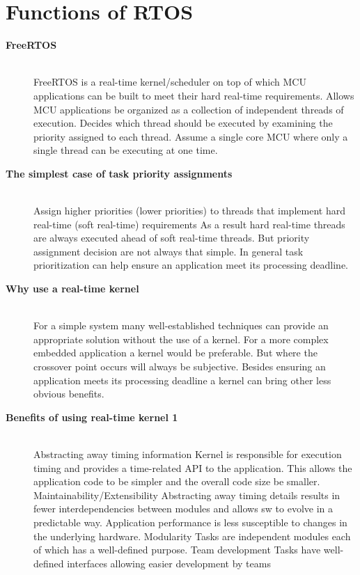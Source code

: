 \section{Functions of RTOS}
\begin{description}


\item[{\rot\bf FreeRTOS}]~\\[-3ex]
\bi
\ite FreeRTOS is a real-time kernel/scheduler on top of which MCU applications can be built to meet their hard real-time requirements.
\bi
\ite Allows MCU applications be organized as a collection of independent threads of execution.
\ite Decides which thread should be executed by examining the priority assigned to each thread.
\bi
\ite Assume a single core MCU where only a single thread can be executing at one time.
\ei
\ei
\ei

\os{\newpage}



\item[{\rot\bf The simplest case of task priority assignments}]~\\[-3ex]
\bi
\ite Assign higher priorities (lower priorities) to threads that implement hard real-time (soft real-time) requirements
\bi
\ite As a result hard real-time threads are always executed ahead of soft real-time threads.
\ei
\ite But priority assignment decision are not always that simple.
\ite
\ite In general task prioritization can help ensure an application meet its processing deadline.
\ei

\os{\newpage}



\item[{\rot\bf Why use a real-time kernel}]~\\[-3ex]
\bi
\ite For a simple system many well-established techniques can provide an  appropriate solution without the use of a kernel.
\ite For a more complex embedded application a kernel would be preferable.
\ite But where the crossover point occurs will always be subjective.
\ite
\ite Besides ensuring an application meets its processing deadline a kernel can bring other less obvious benefits.
\ei

\os{\newpage}



\item[{\rot\bf Benefits of using real-time kernel 1}]~\\[-3ex]
\bi
\ite Abstracting away timing information
\bi
\ite Kernel is responsible for execution timing and provides a time-related API to the application. This allows the application code to be simpler and the overall code size be smaller.
\ei
\ite Maintainability/Extensibility
\bi
\ite Abstracting away timing details results in fewer interdependencies between modules and allows sw to evolve in a predictable way.
\ite Application performance is less susceptible to changes in the underlying hardware.
\ei
\ite Modularity
\bi
\ite Tasks are independent modules each of which has a well-defined purpose.
\ei
\ite Team development
\bi
\ite Tasks have well-defined interfaces allowing easier development by teams
\ei
\ei


\end{description}

